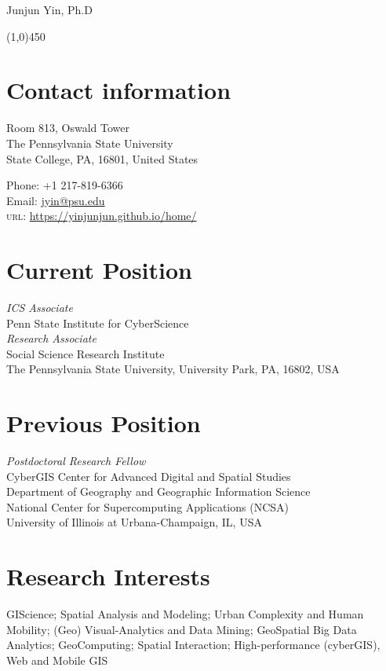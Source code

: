 \documentclass[11pt, a4paper]{article}
\begin{document}
{\LARGE Junjun Yin, Ph.D}
\begin{center}
\line(1,0){450}
\end{center}
\section*{Contact information}

\begin{multicols}{2}
 \begin{flushleft}
Room 813, Oswald Tower\\
The Pennsylvania State University\\
State College, PA, 16801, United States
\end{flushleft}
\columnbreak
\begin{flushright}
Phone: +1 217-819-6366\\[.1cm]
Email: \href{mailto:a.jyin@psu.edu}{jyin@psu.edu}\\[.1cm]
\textsc{url}: \href{https://yinjunjun.github.io/home/}{https://yinjunjun.github.io/home/}
\end{flushright}
\end{multicols}

\section*{Current Position}
\emph{ICS Associate}\\
Penn State Institute for CyberScience\\

\emph{Research Associate}\\
Social Science Research Institute\\
The Pennsylvania State University, University Park, PA, 16802, USA

\section*{Previous Position}
\emph{Postdoctoral Research Fellow}\\
CyberGIS Center for Advanced Digital and Spatial Studies\\
Department of Geography and Geographic Information Science\\
National Center for Supercomputing Applications (NCSA)\\
University of Illinois at Urbana-Champaign, IL, USA

\section*{Research Interests}
GIScience; Spatial Analysis and Modeling; Urban Complexity and Human Mobility; (Geo) Visual-Analytics and Data Mining; 
GeoSpatial Big Data Analytics; GeoComputing; Spatial Interaction; High-performance (cyberGIS), Web and Mobile GIS
\end{document}
